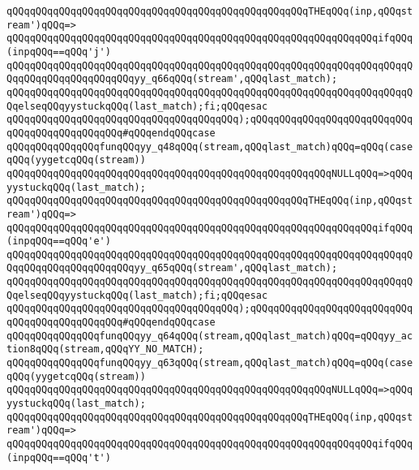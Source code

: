 \verb|qQQqqQQqqQQqqQQqqQQqqQQqqQQqqQQqqQQqqQQqqQQqqQQqqQQqTHEqQQq(inp,qQQqstream')qQQq=>|\newline
\verb|qQQqqQQqqQQqqQQqqQQqqQQqqQQqqQQqqQQqqQQqqQQqqQQqqQQqqQQqqQQqqQQqifqQQq(inpqQQq==qQQq'j')|\newline
\verb|qQQqqQQqqQQqqQQqqQQqqQQqqQQqqQQqqQQqqQQqqQQqqQQqqQQqqQQqqQQqqQQqqQQqqQQqqQQqqQQqqQQqqQQqqQQqyy_q66qQQq(stream',qQQqlast_match);|\newline
\verb|qQQqqQQqqQQqqQQqqQQqqQQqqQQqqQQqqQQqqQQqqQQqqQQqqQQqqQQqqQQqqQQqqQQqqQQqelseqQQqyystuckqQQq(last_match);fi;qQQqesac|\newline
\verb|qQQqqQQqqQQqqQQqqQQqqQQqqQQqqQQqqQQqqQQq);qQQqqQQqqQQqqQQqqQQqqQQqqQQqqQQqqQQqqQQqqQQqqQQq#qQQqendqQQqcase|\newline
\verb|qQQqqQQqqQQqqQQqfunqQQqyy_q48qQQq(stream,qQQqlast_match)qQQq=qQQq(caseqQQq(yygetcqQQq(stream))|\newline
\verb|qQQqqQQqqQQqqQQqqQQqqQQqqQQqqQQqqQQqqQQqqQQqqQQqqQQqqQQqNULLqQQq=>qQQqyystuckqQQq(last_match);|\newline
\verb|qQQqqQQqqQQqqQQqqQQqqQQqqQQqqQQqqQQqqQQqqQQqqQQqqQQqTHEqQQq(inp,qQQqstream')qQQq=>|\newline
\verb|qQQqqQQqqQQqqQQqqQQqqQQqqQQqqQQqqQQqqQQqqQQqqQQqqQQqqQQqqQQqqQQqifqQQq(inpqQQq==qQQq'e')|\newline
\verb|qQQqqQQqqQQqqQQqqQQqqQQqqQQqqQQqqQQqqQQqqQQqqQQqqQQqqQQqqQQqqQQqqQQqqQQqqQQqqQQqqQQqqQQqqQQqyy_q65qQQq(stream',qQQqlast_match);|\newline
\verb|qQQqqQQqqQQqqQQqqQQqqQQqqQQqqQQqqQQqqQQqqQQqqQQqqQQqqQQqqQQqqQQqqQQqqQQqelseqQQqyystuckqQQq(last_match);fi;qQQqesac|\newline
\verb|qQQqqQQqqQQqqQQqqQQqqQQqqQQqqQQqqQQqqQQq);qQQqqQQqqQQqqQQqqQQqqQQqqQQqqQQqqQQqqQQqqQQqqQQq#qQQqendqQQqcase|\newline
\verb|qQQqqQQqqQQqqQQqfunqQQqyy_q64qQQq(stream,qQQqlast_match)qQQq=qQQqyy_action8qQQq(stream,qQQqYY_NO_MATCH);|\newline
\verb|qQQqqQQqqQQqqQQqfunqQQqyy_q63qQQq(stream,qQQqlast_match)qQQq=qQQq(caseqQQq(yygetcqQQq(stream))|\newline
\verb|qQQqqQQqqQQqqQQqqQQqqQQqqQQqqQQqqQQqqQQqqQQqqQQqqQQqqQQqNULLqQQq=>qQQqyystuckqQQq(last_match);|\newline
\verb|qQQqqQQqqQQqqQQqqQQqqQQqqQQqqQQqqQQqqQQqqQQqqQQqqQQqTHEqQQq(inp,qQQqstream')qQQq=>|\newline
\verb|qQQqqQQqqQQqqQQqqQQqqQQqqQQqqQQqqQQqqQQqqQQqqQQqqQQqqQQqqQQqqQQqifqQQq(inpqQQq==qQQq't')|\newline
